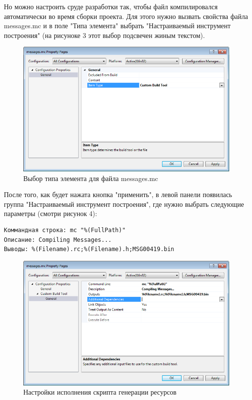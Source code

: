 \documentclass[a4paper, 12pt]{report}		%
\begin{document}
Но можно настроить сруде разработки так, чтобы файл компилировался автоматически во время сборки проекта. Для этого нужно вызвать свойства файла messages.mc и в поле "Типа элемента" выбрать "Настраиваемый инструмент построения" (на рисуноке 3 этот выбор подсвечен жиным текстом).

\begin{figure}[h!]
\centering
\includegraphics[scale=0.8]{res/message_property1}
\caption{Выбор типа элемента для файла messages.mc}
\end{figure}

После того, как будет нажата кнопка "применить", в левой панели появилась группа "Настраиваемый инструмент построения", где нужно выбрать следующие параметры (смотри рисунок 4):
\begin{verbatim}
Коммандная строка: mc "%(FullPath)"
Описание: Compiling Messages...
Выводы: %(Filename).rc;%(Filename).h;MSG00419.bin
\end{verbatim}

\begin{figure}[h!]
\centering
\includegraphics[scale=0.8]{res/message_property2}
\caption{Настройки исполнения скрипта генерации ресурсов}
\end{figure}
\end{document}
